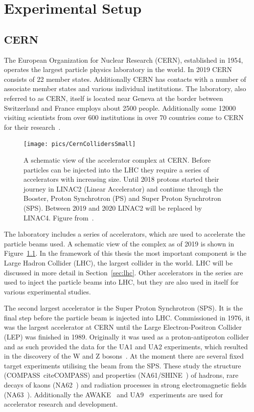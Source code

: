 
\chapter{Experimental Setup}
\label{sec:exp}
\section{CERN}
The European Organization for Nuclear Research (CERN), established in 1954, operates the largest particle physics laboratory in the world. In 2019 CERN consists of 22 member states. Additionally CERN has contacts with a number of associate member states and various individual institutions. The laboratory, also referred to as CERN, itself is located near Geneva at the border between Switzerland and France employs about 2500 people. Additionally some 12000 visiting scientists from over 600 institutions in over 70 countries come to CERN for their research~\cite{CERN}.

\begin{figure}[tb]
\centering
\texttt{[image: pics/CernCollidersSmall]}
\caption[CERN collider complex]{ A schematic view of the accelerator complex at CERN. Before particles can be injected into the LHC they require a series of accelerators with increasing size. Until 2018 protons started their journey in LINAC2 (Linear Accelerator) and continue through the Booster, Proton Synchrotron (PS) and Super Proton Synchrotron (SPS). Between 2019 and 2020 LINAC2 will be replaced by LINAC4. Figure from~\cite{CernComplex}.}
\label{fig:CernComplex}
\end{figure}

The laboratory includes a series of accelerators, which are used to accelerate the particle beams used. A schematic view of the complex as of 2019 is shown in Figure~\ref{fig:CernComplex}. In the framework of this thesis the most important component is the Large Hadron Collider (LHC), the largest collider in the world. LHC will be discussed in more detail in Section~\ref{sec:lhc}. Other accelerators in the series are used to inject the particle beams into LHC, but they are also used in itself for various experimental studies. 

The second largest accelerator is the Super Proton Synchrotron (SPS). It is the final step before the particle beam is injected into LHC. Commissioned in 1976, it was the largest accelerator at CERN until the Large Electron-Positron Collider (LEP) was finished in 1989. Originally it was used as a proton-antiproton collider and as such provided the data for the UA1 and UA2 experiments, which resulted in the discovery of the W and Z bosons~\cite{Watkins:1986va}. At the moment there are several fixed target experiments utilising the beam from the SPS. These study the structure (COMPASS~cite{COMPASS}) and properties (NA61/SHINE~\cite{Laszlo:2009vg}) of hadrons, rare decays of kaons (NA62~\cite{Hahn:1404985}) and radiation processes in strong electromagnetic fields (NA63~\cite{Mikkelsen:1955391}). Additionally the AWAKE~\cite{Dobert:2669231} and UA9~\cite{Losito:1223625} experiments are used for accelerator research and development. 

